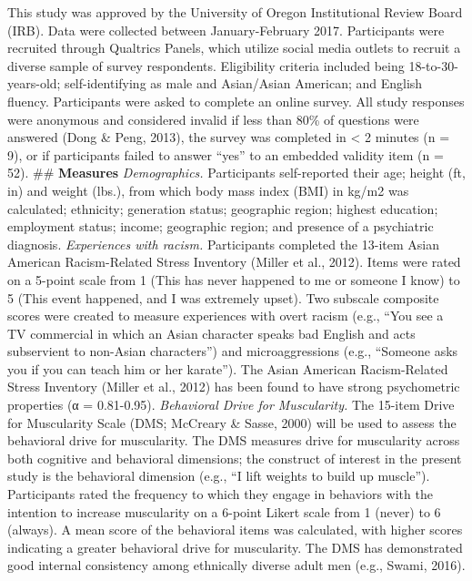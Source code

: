 \documentclass[
  12pt,
]{article}
\begin{document}
This study was approved by the University of Oregon Institutional Review
Board (IRB). Data were collected between January-February 2017.
Participants were recruited through Qualtrics Panels, which utilize
social media outlets to recruit a diverse sample of survey respondents.
Eligibility criteria included being 18-to-30-years-old; self-identifying
as male and Asian/Asian American; and English fluency. Participants were
asked to complete an online survey. All study responses were anonymous
and considered invalid if less than 80\% of questions were answered
(Dong \& Peng, 2013), the survey was completed in \textless{} 2 minutes
(n = 9), or if participants failed to answer ``yes'' to an embedded
validity item (n = 52). \#\# \textbf{Measures} \emph{Demographics.}
Participants self-reported their age; height (ft, in) and weight (lbs.),
from which body mass index (BMI) in kg/m2 was calculated; ethnicity;
generation status; geographic region; highest education; employment
status; income; geographic region; and presence of a psychiatric
diagnosis. \emph{Experiences with racism.} Participants completed the
13-item Asian American Racism-Related Stress Inventory (Miller et al.,
2012). Items were rated on a 5-point scale from 1 (This has never
happened to me or someone I know) to 5 (This event happened, and I was
extremely upset). Two subscale composite scores were created to measure
experiences with overt racism (e.g., ``You see a TV commercial in which
an Asian character speaks bad English and acts subservient to non-Asian
characters'') and microaggressions (e.g., ``Someone asks you if you can
teach him or her karate''). The Asian American Racism-Related Stress
Inventory (Miller et al., 2012) has been found to have strong
psychometric properties (α = 0.81-0.95). \emph{Behavioral Drive for
Muscularity.} The 15-item Drive for Muscularity Scale (DMS; McCreary \&
Sasse, 2000) will be used to assess the behavioral drive for
muscularity. The DMS measures drive for muscularity across both
cognitive and behavioral dimensions; the construct of interest in the
present study is the behavioral dimension (e.g., ``I lift weights to
build up muscle''). Participants rated the frequency to which they
engage in behaviors with the intention to increase muscularity on a
6-point Likert scale from 1 (never) to 6 (always). A mean score of the
behavioral items was calculated, with higher scores indicating a greater
behavioral drive for muscularity. The DMS has demonstrated good internal
consistency among ethnically diverse adult men (e.g., Swami, 2016).
\end{document}
